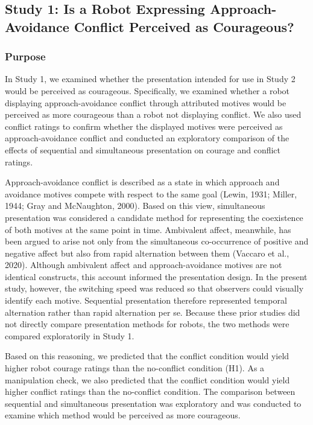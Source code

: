 \documentclass[
]{article}
\begin{document}
\subsection{Study 1: Is a Robot Expressing Approach-Avoidance Conflict
Perceived as
Courageous?}\label{study-1-is-a-robot-expressing-approach-avoidance-conflict-perceived-as-courageous}

\subsubsection{Purpose}\label{purpose}

In Study 1, we examined whether the presentation intended for use in
Study 2 would be perceived as courageous. Specifically, we examined
whether a robot displaying approach-avoidance conflict through
attributed motives would be perceived as more courageous than a robot
not displaying conflict. We also used conflict ratings to confirm
whether the displayed motives were perceived as approach-avoidance
conflict and conducted an exploratory comparison of the effects of
sequential and simultaneous presentation on courage and conflict
ratings.

Approach-avoidance conflict is described as a state in which approach
and avoidance motives compete with respect to the same goal (Lewin,
1931; Miller, 1944; Gray and McNaughton, 2000). Based on this view,
simultaneous presentation was considered a candidate method for
representing the coexistence of both motives at the same point in time.
Ambivalent affect, meanwhile, has been argued to arise not only from the
simultaneous co-occurrence of positive and negative affect but also from
rapid alternation between them (Vaccaro et al., 2020). Although
ambivalent affect and approach-avoidance motives are not identical
constructs, this account informed the presentation design. In the
present study, however, the switching speed was reduced so that
observers could visually identify each motive. Sequential presentation
therefore represented temporal alternation rather than rapid alternation
per se. Because these prior studies did not directly compare
presentation methods for robots, the two methods were compared
exploratorily in Study 1.

Based on this reasoning, we predicted that the conflict condition would
yield higher robot courage ratings than the no-conflict condition (H1).
As a manipulation check, we also predicted that the conflict condition
would yield higher conflict ratings than the no-conflict condition. The
comparison between sequential and simultaneous presentation was
exploratory and was conducted to examine which method would be perceived
as more courageous.
\end{document}
